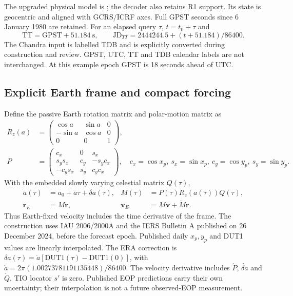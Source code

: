 The upgraded physical model is ; the decoder also retains
R1 support. Its state is geocentric and aligned
with GCRS/ICRF axes. Full GPST seconds since 6 January 1980 are retained. For an
elapsed query $\tau$, $t=t_0+\tau$ and
\begin{equation}
\mathrm{TT}=\mathrm{GPST}+51.184\ \mathrm{s},\qquad
\mathrm{JD}_{TT}=2444244.5+(t+51.184)/86400.
\end{equation}
The Chandra input is labelled TDB and is explicitly converted during construction
and review. GPST, UTC, TT and TDB calendar labels are not interchanged. At this
example epoch GPST is 18 seconds ahead of UTC.

\subsection{Explicit Earth frame and compact forcing}
Define the passive Earth rotation matrix and polar-motion matrix as
\begin{align}
R_z(a)&=\begin{pmatrix}\cos a&\sin a&0\\-\sin a&\cos a&0\\0&0&1\end{pmatrix},\\
P&=\begin{pmatrix}c_x&0&s_x\\s_y s_x&c_y&-s_y c_x\\-c_y s_x&s_y&c_y c_x\end{pmatrix},
\quad c_x=\cos x_p,\ s_x=\sin x_p,\ c_y=\cos y_p,\ s_y=\sin y_p.
\end{align}
With the embedded slowly varying celestial matrix $Q(\tau)$,
\begin{align}
a(\tau)&=a_0+\dot a\tau+\delta a(\tau),& M(\tau)&=P(\tau)R_z(a(\tau))Q(\tau),\\
\mathbf r_E&=M\mathbf r,& \mathbf v_E&=M\mathbf v+\dot M\mathbf r.
\end{align}
Thus Earth-fixed velocity includes the time derivative of the frame.
The construction uses IAU 2006/2000A and the IERS Bulletin A published on
26 December 2024, before the forecast epoch. Published daily $x_p,y_p$ and
DUT1 values are linearly interpolated. The ERA correction is
$\delta a(\tau)=\dot a[\mathrm{DUT1}(\tau)-\mathrm{DUT1}(0)]$, with
$\dot a=2\pi(1.00273781191135448)/86400$.
The velocity derivative includes $\dot P$, $\dot {\delta a}$ and $\dot Q$.
TIO locator $s'$ is zero. Published EOP predictions carry their own uncertainty;
their interpolation is not a future observed-EOP measurement.

